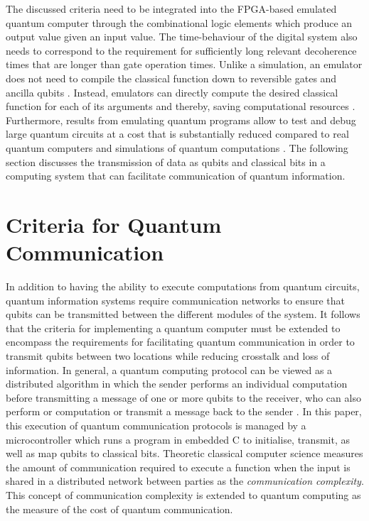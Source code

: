 The discussed criteria need to be integrated into the FPGA-based emulated quantum computer through the combinational logic elements which produce an output value given an input value. The time-behaviour of the digital system also needs to correspond to the requirement for sufficiently long relevant decoherence times that are longer than gate operation times. Unlike a simulation, an emulator does not need to compile the classical function down to reversible gates and ancilla qubits \cite{haner2016high}. Instead, emulators can directly compute the desired classical function for each of its arguments and thereby, saving computational resources \cite{haner2016high}. Furthermore, results from emulating quantum programs allow to test and debug large quantum circuits at a cost that is substantially reduced compared to real quantum computers and simulations of quantum computations \cite{haner2016high}. The following section discusses the transmission of data as qubits and classical bits in a computing system that can facilitate communication of quantum information.

\section{Criteria for Quantum Communication}

In addition to having the ability to execute computations from quantum circuits, quantum information systems require communication networks to ensure that qubits can be transmitted between the different modules of the system. It follows that the criteria for implementing a quantum computer must be extended to encompass the requirements for facilitating quantum communication in order to transmit qubits between two locations while reducing \gls{crosstalk} and loss of information. In general, a quantum computing protocol can be viewed as a distributed algorithm in which the sender performs an individual computation before transmitting a message of one or more qubits to the receiver, who can also perform or computation or transmit a message back to the sender \cite{DeWolf2019}. In this paper, this execution of quantum communication protocols is managed by a microcontroller which runs a program in embedded C to initialise, transmit, as well as map qubits to classical bits. Theoretic classical computer science measures the amount of communication required to execute a function when the input is shared in a distributed network between parties as the \textit{communication complexity}. This concept of communication complexity is extended to quantum computing as the measure of the cost of quantum communication. 

